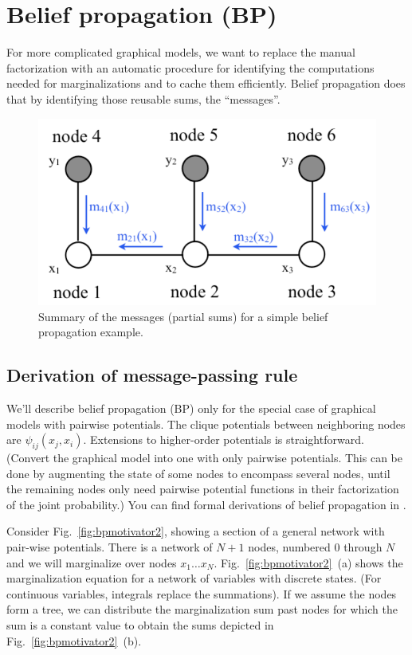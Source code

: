 \section{Belief propagation (BP)}

For more complicated graphical models, we want to 
replace the manual factorization
with an automatic procedure for identifying the
computations needed for marginalizations and to 
cache them efficiently.  Belief propagation does that by
identifying those reusable sums, the ``messages''. 

\begin{figure}
\centerline{\includegraphics[width=0.60\linewidth]{figures/graphical_models/3bpc.pdf}} 
\caption{Summary of the messages (partial sums) for a simple belief propagation example.} 
\label{fig:3bpc}
\end{figure}

\subsection{Derivation of message-passing rule}
\label{sect:bpRules}

We'll describe belief propagation (BP) only for the special case of
graphical models with pairwise potentials.  
The clique potentials between neighboring nodes are $\psi_{ij}(x_j, x_i)$.
Extensions to higher-order
potentials is straightforward.  (Convert the
graphical model into one with only pairwise potentials.  This can be
done by augmenting the state of some nodes to encompass several nodes,
until the remaining nodes only need pairwise potential functions in
their factorization of the joint probability.)  You can find formal
derivations of belief propagation in \cite{Jordan98,Koller2009}.

Consider Fig.~\ref{fig:bpmotivator2}, showing a section of a general network with pair-wise potentials.  There is a network of $N+1$
nodes, numbered 0 through $N$ and we will marginalize over nodes
$x_1 \ldots x_N$.  Fig.~\ref{fig:bpmotivator2}~(a) shows the
marginalization equation for a network of variables with discrete states. (For continuous variables, integrals replace the summations). If we assume the nodes form a tree, we can
distribute the marginalization sum
past nodes for which the sum is a constant value to obtain the sums
depicted in Fig.~\ref{fig:bpmotivator2}~(b).  

